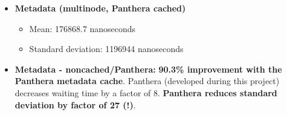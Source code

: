 \documentclass[12pt]{article}
\begin{document}
\begin{itemize}
    		\item \textbf{Metadata (multinode, Panthera cached)}
    		\begin{itemize}
			\item Mean: 176868.7 nanoseconds
			\item Standard deviation: 1196944 nanoseconds 	 		
    		\end{itemize}
    		
    		\item \textbf{Metadata - noncached/Panthera: } \textbf{90.3\% improvement with the Panthera metadata cache}. Panthera (developed during this project) decreases waiting time by a factor of 8. \textbf{Panthera reduces standard deviation by factor of 27 (!)}.
    \end{itemize}
\end{document}
